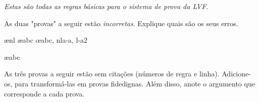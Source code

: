 \emph{Estas s\~ao todas as regras b\'asicas para o sistema de prova da LVF.}


\practiceproblems

\problempart
As duas "provas" a seguir est\~ao  \emph{incorretas}. Explique quais s\~ao os seus erros.
\begin{fitchproof}
\open
{}
\ae{nl}
	\ae{abc}
\close
\open
\close
{}\oe{abc, nla-a, l-a2}
\end{fitchproof}

\begin{fitchproof}
\ae{abc}
\end{fitchproof}

\problempart
As tr\^es provas a seguir est\~ao sem cita\c c\~oes (n\'umeros de regra e linha). Adicione-os, para transform\'a-las  em provas fidedignas.  Al\'em disso, anote o argumento que corresponde a cada prova.
\begin{multicols}{2}
\begin{fitchproof}
\end{fitchproof}

\begin{fitchproof}
\open
\close
{}%
\end{fitchproof}

\begin{fitchproof}
\open
\close
\open
\close
{}%
\end{fitchproof}
\end{multicols}

